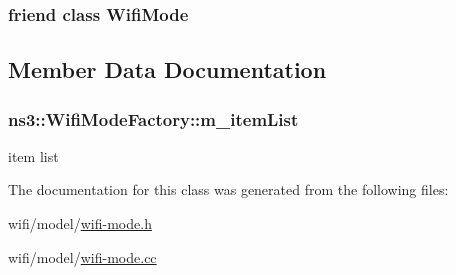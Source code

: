 \subsubsection[{\texorpdfstring{Wifi\+Mode}{WifiMode}}]{\setlength{\rightskip}{0pt plus 5cm}friend class {\bf Wifi\+Mode}\hspace{0.3cm}{\ttfamily [friend]}}\hypertarget{classns3_1_1WifiModeFactory_af4f7ddea2391d3900ddb643f3bfeeefd}{}\label{classns3_1_1WifiModeFactory_af4f7ddea2391d3900ddb643f3bfeeefd}


\subsection{Member Data Documentation}
\subsubsection[{\texorpdfstring{m\+\_\+item\+List}{m_itemList}}]{ ns3\+::\+Wifi\+Mode\+Factory\+::m\+\_\+item\+List\hspace{0.3cm}{\ttfamily [private]}}\hypertarget{classns3_1_1WifiModeFactory_aa8fc74e45dbb82fc08d4d5eb967266e6}{}\label{classns3_1_1WifiModeFactory_aa8fc74e45dbb82fc08d4d5eb967266e6}


item list 



The documentation for this class was generated from the following files\+:\begin{DoxyCompactItemize}
\item 
wifi/model/\hyperlink{wifi-mode_8h}{wifi-\/mode.\+h}\item 
wifi/model/\hyperlink{wifi-mode_8cc}{wifi-\/mode.\+cc}\end{DoxyCompactItemize}
